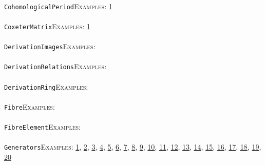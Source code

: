 \documentclass[a4paper,11pt]{report}
\begin{document}
{{ \\
 \texttt{CohomologicalPeriod}{\nobreakspace}{\nobreakspace}{\nobreakspace}{\nobreakspace}\textsc{Examples:} \href{tutorial/chap10.html} {1}{\nobreakspace} \\
 \\
 \texttt{CoxeterMatrix}{\nobreakspace}{\nobreakspace}{\nobreakspace}{\nobreakspace}\textsc{Examples:} \href{../www/SideLinks/About/aboutDavisComplex.html} {1}{\nobreakspace} \\
 \\
 \texttt{DerivationImages}{\nobreakspace}{\nobreakspace}{\nobreakspace}{\nobreakspace}\textsc{Examples:} \\
 \\
 \texttt{DerivationRelations}{\nobreakspace}{\nobreakspace}{\nobreakspace}{\nobreakspace}\textsc{Examples:} \\
 \\
 \texttt{DerivationRing}{\nobreakspace}{\nobreakspace}{\nobreakspace}{\nobreakspace}\textsc{Examples:} \\
 \\
 \texttt{Fibre}{\nobreakspace}{\nobreakspace}{\nobreakspace}{\nobreakspace}\textsc{Examples:} \\
 \\
 \texttt{FibreElement}{\nobreakspace}{\nobreakspace}{\nobreakspace}{\nobreakspace}\textsc{Examples:} \\
 \\
 \texttt{Generators}{\nobreakspace}{\nobreakspace}{\nobreakspace}{\nobreakspace}\textsc{Examples:} \href{tutorial/chap3.html} {1}{\nobreakspace}, \href{tutorial/chap7.html} {2}{\nobreakspace}, \href{tutorial/chap8.html} {3}{\nobreakspace}, \href{tutorial/chap10.html} {4}{\nobreakspace}, \href{../www/SideLinks/About/aboutModPRings.html} {5}{\nobreakspace}, \href{../www/SideLinks/About/aboutParallel.html} {6}{\nobreakspace}, \href{../www/SideLinks/About/aboutBredon.html} {7}{\nobreakspace}, \href{../www/SideLinks/About/aboutPerformance.html} {8}{\nobreakspace}, \href{../www/SideLinks/About/aboutPeriodic.html} {9}{\nobreakspace}, \href{../www/SideLinks/About/aboutCohomologyRings.html} {10}{\nobreakspace}, \href{../www/SideLinks/About/aboutCoveringSpaces.html} {11}{\nobreakspace}, \href{../www/SideLinks/About/aboutCoverinSpaces.html} {12}{\nobreakspace}, \href{../www/SideLinks/About/aboutRandomComplexes.html} {13}{\nobreakspace}, \href{../www/SideLinks/About/aboutExtensions.html} {14}{\nobreakspace}, \href{../www/SideLinks/About/aboutSpaceGroup.html} {15}{\nobreakspace}, \href{../www/SideLinks/About/aboutFunctorial.html} {16}{\nobreakspace}, \href{../www/SideLinks/About/aboutIntro.html} {17}{\nobreakspace}, \href{../www/SideLinks/About/aboutTopology.html} {18}{\nobreakspace}, \href{../www/SideLinks/About/aboutTorAndExt.html} {19}{\nobreakspace}, \href{../www/SideLinks/About/aboutTwistedCoefficients.html} {20}{\nobreakspace} \\
}}
\end{document}
